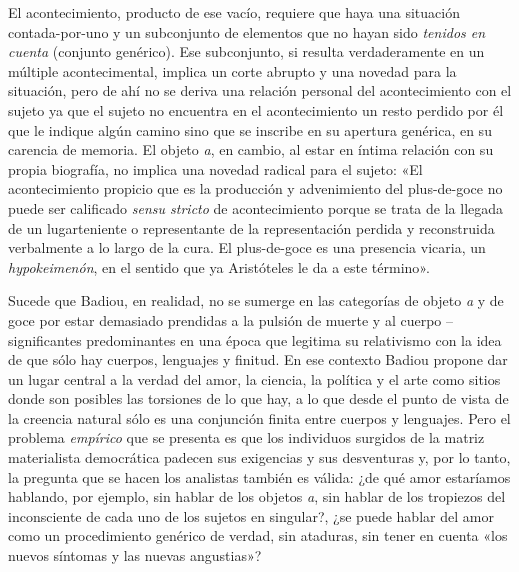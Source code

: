 El acontecimiento, producto de ese vacío, requiere que haya una situación contada-por-uno y un subconjunto de elementos que no hayan sido \emph{tenidos en cuenta} (conjunto genérico). Ese subconjunto, si resulta verdaderamente en un múltiple acontecimental, implica un corte abrupto y una novedad para la situación, pero de ahí no se deriva una relación personal del acontecimiento con el sujeto ya que el sujeto no encuentra en el acontecimiento un resto perdido por él que le indique algún camino sino que se inscribe en su apertura genérica, en su carencia de memoria. El objeto \emph{a}, en cambio, al estar en íntima relación con su propia biografía, no implica una novedad radical para el sujeto: «El acontecimiento propicio que es la producción y advenimiento del plus-de-goce no puede ser calificado \emph{sensu stricto} de acontecimiento porque se trata de la llegada de un lugarteniente o representante de la representación perdida y reconstruida verbalmente a lo largo de la cura. El plus-de-goce es una presencia vicaria, un \emph{hypokeimenón}, en el sentido que ya Aristóteles le da a este término».

Sucede que Badiou, en realidad, no se sumerge en las categorías de objeto \emph{a} y de goce por estar demasiado prendidas a la pulsión de muerte y al cuerpo --significantes predominantes en una época que legitima su relativismo con la idea de que sólo hay cuerpos, lenguajes y finitud. En ese contexto Badiou propone dar un lugar central a la verdad del amor, la ciencia, la política y el arte como sitios donde son posibles las torsiones de lo que hay, a lo que desde el punto de vista de la creencia natural sólo es una conjunción finita entre cuerpos y lenguajes. Pero el problema \emph{empírico} que se presenta es que los individuos surgidos de la matriz materialista democrática padecen sus exigencias y sus desventuras y, por lo tanto, la pregunta que se hacen los analistas también es válida: ¿de qué amor estaríamos hablando, por ejemplo, sin hablar de los objetos \emph{a}, sin hablar de los tropiezos del inconsciente de cada uno de los sujetos en singular?, ¿se puede hablar del amor como un procedimiento genérico de verdad, sin ataduras, sin tener en cuenta «los nuevos síntomas y las nuevas angustias»?

